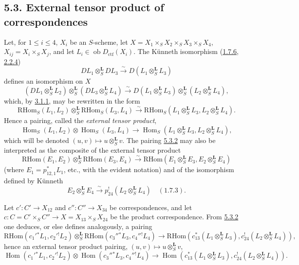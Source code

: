 \documentclass[11pt]{article}
\DeclareMathOperator{\Hom}{Hom}
\providecommand{\RHom}{\mathrm{RHom}}
\providecommand{\RHom}{\mathrm{RHom}}
\providecommand{\Hom}{\operatorname{Hom}}
\providecommand{\RHom}{\mathrm R\mathcal{H}om}
\providecommand{\RHom}{\mathrm{RHom}}
\providecommand{\Hom}{\operatorname{Hom}}
\begin{document}
\subsection*{5.3. External tensor product of correspondences}\label{sga5:III:subsection:5.3}

Let, for $1\leq i\leq 4$, $X_i$ be an $S$-scheme, let $X=X_1\times_SX_2\times_SX_3\times_SX_4$, $X_{ij}=X_i\times_SX_j$, and let $L_i\in\operatorname{ob}D_{\mathrm{ctf}}(X_i)$. The Künneth isomorphism (\hyperref[sga5:III:equation:1.7.6]{1.7.6}, \hyperref[sga5:III:equation:2.2.4]{2.2.4})
\[
DL_1\otimes_S^{\mathbf L}DL_3\xrightarrow{\sim}D(L_1\otimes_S^{\mathbf L}L_3)
\]
defines an isomorphism on $X$
\begin{equation}
\tag{5.3.1}\label{sga5:III:equation:5.3.1}
(DL_1\otimes_S^{\mathbf L}L_2)\otimes_S^{\mathbf L}(DL_3\otimes_S^{\mathbf L}L_4)
\xrightarrow{\sim}D(L_1\otimes_S^{\mathbf L}L_3)\otimes_S^{\mathbf L}(L_2\otimes_S^{\mathbf L}L_4),
\end{equation}
which, by \hyperref[sga5:III:equation:3.1.1]{3.1.1}, may be rewritten in the form
\begin{equation}
\tag{5.3.2}\label{sga5:III:equation:5.3.2}
\RHom_S(L_1,L_2)\otimes_S^{\mathbf L}\RHom_S(L_3,L_4)
\xrightarrow{\sim}\RHom_S(L_1\otimes_S^{\mathbf L}L_3,L_2\otimes_S^{\mathbf L}L_4).
\end{equation}
Hence a pairing, called the \emph{external tensor product},
\begin{equation}
\tag{5.3.3}\label{sga5:III:equation:5.3.3}
\Hom_S(L_1,L_2)\otimes\Hom_S(L_3,L_4)
\longrightarrow\Hom_S(L_1\otimes_S^{\mathbf L}L_3,L_2\otimes_S^{\mathbf L}L_4),
\end{equation}
which will be denoted $(u,v)\mapsto u\otimes_S^{\mathbf L}v$. The pairing \hyperref[sga5:III:equation:5.3.2]{5.3.2} may also be interpreted as the composite of the external tensor product
\[
\RHom(E_1,E_2)\otimes_S^{\mathbf L}\RHom(E_3,E_4)
\xrightarrow{\sim}\RHom(E_1\otimes_S^{\mathbf L}E_3,E_2\otimes_S^{\mathbf L}E_4)
\]
(where $E_1=p_{12,1}^*L_1$, etc., with the evident notation) and of the isomorphism defined by Künneth
\[
E_2\otimes_S^{\mathbf L}E_4\xrightarrow{\sim}p_{24}^!(L_2\otimes_S^{\mathbf L}L_4)\quad \hyperref[sga5:III:equation:1.7.3]{(1.7.3)}.
\]

Let $c':C'\to X_{12}$ and $c'':C''\to X_{34}$ be correspondences, and let $c:C=C'\times_SC''\to X=X_{13}\times_SX_{24}$ be the product correspondence. From \hyperref[sga5:III:equation:5.3.2]{5.3.2} one deduces, or else defines analogously, a pairing
\begin{equation}
\tag{5.3.4}\label{sga5:III:equation:5.3.4}
\RHom(c_1'{}^*L_1,c_2'{}^!L_2)\otimes_S^{\mathbf L}\RHom(c_3''{}^*L_3,c_4''{}^!L_4)
\longrightarrow\RHom(c_{13}^*(L_1\otimes_S^{\mathbf L}L_3),c_{24}^!(L_2\otimes_S^{\mathbf L}L_4)),
\end{equation}
hence an external tensor product pairing, $(u,v)\mapsto u\otimes_S^{\mathbf L}v$,
\begin{equation}
\tag{5.3.5}\label{sga5:III:equation:5.3.5}
\Hom(c_1'{}^*L_1,c_2'{}^!L_2)\otimes\Hom(c_3''{}^*L_3,c_4''{}^!L_4)
\longrightarrow\Hom(c_{13}^*(L_1\otimes_S^{\mathbf L}L_3),c_{24}^!(L_2\otimes_S^{\mathbf L}L_4)).
\end{equation}
\end{document}
